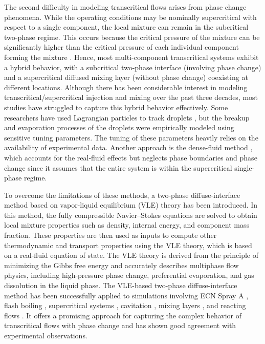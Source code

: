The second difficulty in modeling transcritical flows arises from phase change phenomena. While the operating conditions may be nominally supercritical with respect to a single component, the local mixture can remain in the subcritical two-phase regime. This occurs because the critical pressure of the mixture can be significantly higher than the critical pressure of each individual component forming the mixture \cite{van1980critical,tudisco2020numerical,zhang2022multicomponent}. Hence, most multi-component transcritical systems exhibit a hybrid behavior, with a subcritical two-phase interface (involving phase change) and a supercritical diffused mixing layer (without phase change) coexisting at different locations. %
Although there has been considerable interest in modeling transcritical/supercritical injection and mixing over the past three decades, most studies have struggled to capture this hybrid behavior effectively. Some researchers have used Lagrangian particles to track droplets \cite{pei2015large,kahila2018large,gadalla2020large}, but the breakup and evaporation processes of the droplets were empirically modeled using sensitive tuning parameters. The tuning of these parameters heavily relies on the availability of experimental data. Another approach is the dense-fluid method \cite{yang2000modeling,lacaze2015analysis,jofre2021transcritical}, which accounts for the real-fluid effects but neglects phase boundaries and phase change since it assumes that the entire system is within the supercritical single-phase regime. 


To overcome the limitations of these methods, a two-phase diffuse-interface method based on vapor-liquid equilibrium (VLE) theory has been introduced. In this method, the fully compressible Navier–Stokes equations are solved to obtain local mixture properties such as density, internal energy, and component mass fraction. These properties are then used as inputs to compute other thermodynamic and transport properties using the VLE theory, which is based on a real-fluid equation of state. The VLE theory is derived from the principle of minimizing the Gibbs free energy and accurately describes multiphase flow physics, including high-pressure phase change, preferential evaporation, and gas dissolution in the liquid phase. The VLE-based two-phase diffuse-interface method has been successfully applied to simulations involving ECN Spray A \cite{matheis2018multi, yang2020real}, flash boiling \cite{yi2019multicomponent}, supercritical  systems \cite{zhang2022multicomponent}, cavitation \cite{yang2020parametric}, mixing layers \cite{tudisco2020vapor}, and reacting flows \cite{fathi2022large,srinivasan2023vle}. It offers a promising approach for capturing the complex behavior of transcritical flows with phase change and has shown good agreement with experimental observations. 


